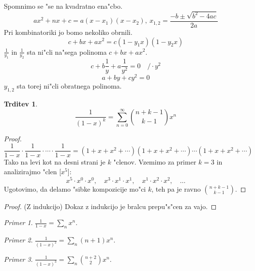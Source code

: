 \documentclass[a4paper,12pt]{article}
\theoremstyle{definition}
\newtheorem{claim}[counter]{Trditev}
\theoremstyle{remark}
\newtheorem*{ex}{Primer}
\begin{document}
Spomnimo se "se na kvadratno ena"cbo.
\[ax^2 + nx + c = a (x - x_1)(x - x_2), \ x_{1, 2} = \frac{- b \pm \sqrt{b^2 - 4ac}}{2a}\]
Pri kombinatoriki jo bomo nekoliko obrnili.
\[c + bx + ax^2 = c(1 - y_1 x)(1 - y_2 x)\]
$\frac{1}{y_1}$ in $\frac{1}{y_2}$ sta ni"cli na"sega polinoma $c + bx + ax^2$.
\[c + b\frac{1}{y} + a\frac{1}{y^2} = 0 \quad / \cdot y^2\]
\[a + by + cy^2 = 0\]
$y_{1, 2}$ sta torej ni"cli obratnega polinoma.

\begin{claim}
    \[\frac{1}{(1 - x)^k} = \sum_{n = 0}^{\infty} \binom{n + k - 1}{k - 1} x^n\]
    \label{produkt_enostavnih_vrst}
\end{claim}

\begin{proof}
    \[\frac{1}{1 - x} \cdot \frac{1}{1 - x} \cdot \cdots \cdot \frac{1}{1 - x} = (1 + x + x^2 + \cdots)(1 + x + x^2 + \cdots)\cdots(1 + x + x^2 + \cdots)\]
    Tako na levi kot na desni strani je $k$ "clenov.
    Vzemimo za primer $k = 3$ in analizirajmo "clen [$x^5$]:
    \[x^5 \cdot x^0 \cdot x^0, \quad x^3 \cdot x^1 \cdot x^1,\quad x^1 \cdot x^2 \cdot x^2, \quad \ldots \]
    Ugotovimo, da delamo "sibke kompozicije mo"ci $k$, teh pa je ravno $\binom{n + k - 1}{k - 1}$.
\end{proof}

\begin{proof}(Z indukcijo)
    Dokaz z indukcijo je bralcu prepu"s"cen za vajo.
\end{proof}

\begin{ex}
	$\frac{1}{1 - x} = \sum_n x^n$.	
\end{ex}
\begin{ex}
	$\frac{1}{(1 - x)^2} = \sum_n (n + 1)x^n$.
\end{ex}
\begin{ex}
	$\frac{1}{(1 - x)^3} = \sum_n \binom{n + 2}{2} x^n$.
\end{ex}
\end{document}
